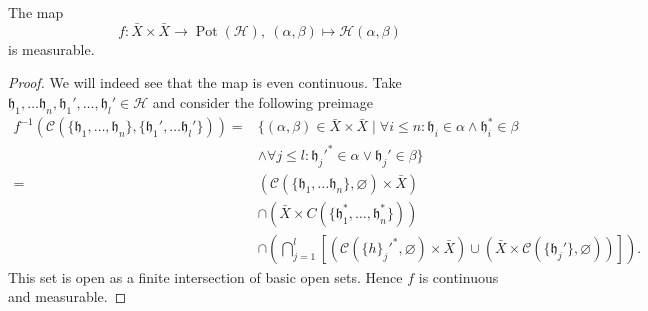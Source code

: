 \begin{lemma}
  The map
  \[
    f\colon \bar X \times \bar X \to \operatorname{Pot}(\mathcal{H}),\ (\alpha, \beta)\mapsto \mathcal{H}(\alpha, \beta)
  \]
  is measurable.
\end{lemma}

\begin{proof}
  We will indeed see that the map is even continuous. Take \(\mathfrak{h}_1,\dots \mathfrak{h}_n, \mathfrak{h}_1', \dots, \mathfrak{h}_l' \in \mathcal{H}\) and consider the following preimage
  \begin{align*}
    f^{-1}(\mathcal{C}(\{\mathfrak{h}_1, \dots, \mathfrak{h}_n\}, \{\mathfrak{h}_1', \dots \mathfrak{h}_l'\}))  = & \{(\alpha, \beta) \in \bar X \times \bar X \mid \forall i \leq n\colon \mathfrak{h}_i \in \alpha \wedge \mathfrak{h}_i^\ast \in \beta\\
    & \wedge \forall j \leq l \colon \mathfrak{h}_j'^\ast \in \alpha \vee \mathfrak{h}_j' \in \beta\}\\
    = & (\mathcal{C}(\{\mathfrak{h}_1, \dots \mathfrak{h}_n\}, \varnothing)  \times \bar X)\\
    & \cap (\bar X \times C(\{\mathfrak{h}_1^\ast, \dots, \mathfrak{h}_n^\ast\}))\\
                                                                                                                  & \cap \left ( \bigcap_{j=1}^l \left[(\mathcal{C}(\{h\}_j'^\ast, \varnothing) \times \bar X) \cup (\bar X \times \mathcal{C}(\{\mathfrak{h}_j'\}, \varnothing))\right]\right).
  \end{align*}
  This set is open as a finite intersection of basic open sets. Hence \(f\) is continuous and measurable.
\end{proof}


